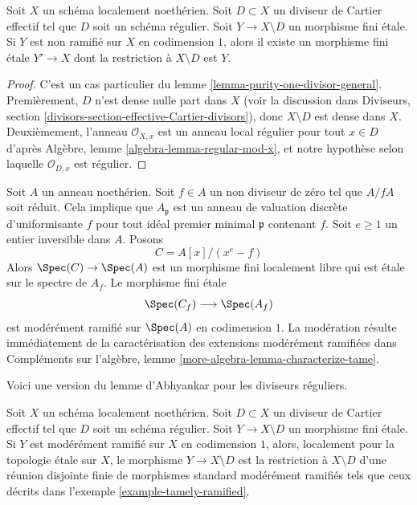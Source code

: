 \begin{lemma}
\label{lemma-purity-one-divisor}
Soit $X$ un schéma localement noethérien. Soit $D \subset X$
un diviseur de Cartier effectif tel que $D$ soit un schéma régulier.
Soit $Y \to X \setminus D$ un morphisme fini \'etale.
Si $Y$ est non ramifié sur $X$ en codimension $1$, alors
il existe un morphisme fini \'etale $Y' \to X$
dont la restriction à $X \setminus D$ est $Y$.
\end{lemma}

\begin{proof}
C'est un cas particulier du lemme \ref{lemma-purity-one-divisor-general}.
Premièrement, $D$ n'est dense nulle part dans $X$ (voir la discussion dans
Diviseurs, section \ref{divisors-section-effective-Cartier-divisors}),
donc $X \setminus D$ est dense dans $X$. Deuxièmement, l'anneau
$\mathcal{O}_{X, x}$ est un anneau local régulier pour tout $x \in D$ d'après
Algèbre, lemme \ref{algebra-lemma-regular-mod-x},
et notre hypothèse selon laquelle $\mathcal{O}_{D, x}$ est régulier.
\end{proof}

\begin{example}
\label{example-tamely-ramified}
Soit $A$ un anneau noethérien. Soit $f \in A$ un non diviseur de zéro
tel que $A/fA$ soit réduit. Cela implique que $A_\mathfrak p$
est un anneau de valuation discrète d'uniformisante $f$ pour tout
idéal premier minimal $\mathfrak p$ contenant $f$. Soit $e \geq 1$ un entier
inversible dans $A$. Posons
$$
C = A[x]/(x^e - f)
$$
Alors $\Spec(C) \to \Spec(A)$ est un morphisme fini localement libre
qui est \'etale sur le spectre de $A_f$. Le morphisme fini \'etale
$$
\Spec(C_f) \longrightarrow \Spec(A_f)
$$
est modérément ramifié sur $\Spec(A)$ en codimension $1$. La
modération résulte immédiatement de la caractérisation des extensions
modérément ramifiées dans
Compléments sur l'algèbre, lemme \ref{more-algebra-lemma-characterize-tame}.
\end{example}

\noindent
Voici une version du lemme d'Abhyankar pour les diviseurs réguliers.

\begin{lemma}
\label{lemma-abhyankar-one-divisor}
Soit $X$ un schéma localement noethérien. Soit $D \subset X$
un diviseur de Cartier effectif tel que $D$ soit un schéma régulier.
Soit $Y \to X \setminus D$ un morphisme fini \'etale.
Si $Y$ est modérément ramifié sur $X$ en codimension $1$, alors,
localement pour la topologie \'etale sur $X$, le morphisme $Y \to X \setminus D$ est la restriction
à $X \setminus D$ d'une réunion disjointe finie de morphismes standard modérément ramifiés
tels que ceux décrits dans l'exemple \ref{example-tamely-ramified}.
\end{lemma}

